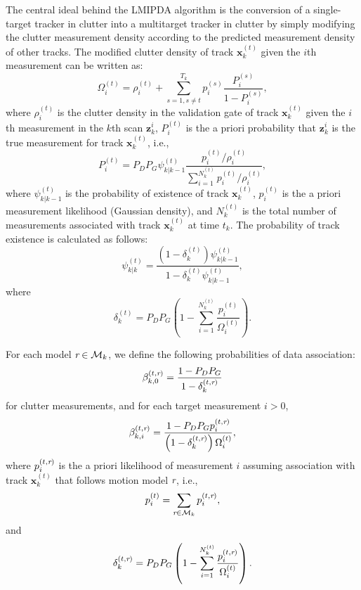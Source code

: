 \documentclass[times]{asjcauth}
\begin{document}
The central ideal behind the LMIPDA algorithm is the conversion of a single-target tracker in clutter into a multitarget tracker in clutter by simply modifying the clutter measurement density according to the predicted measurement density of other tracks. The modified clutter density of track $\mathbf{x}_{k}^{(t)}$ given the $i$th measurement can be written as:
\begin{equation*}
\Omega_{i}^{(t)} = \rho_{i}^{(t)} + \sum_{s=1,s\neq
t}^{T_{k}}p_{i}^{(s)}\frac{P_{i}^{(s)}}{1-P_{i}^{(s)}},
\end{equation*}
\noindent where $\rho_{i}^{(t)}$ is the clutter density in the validation gate of track $\mathbf{x}_{k}^{(t)}$ given the $i$th measurement in the $k$th scan $\mathbf{z}_{k}^{i}$, $P_{i}^{(t)}$ is the a priori probability that $\mathbf{z}_{k}^{i}$ is the true measurement for track $\mathbf{x}_{k}^{(t)}$, i.e.,
\begin{equation*}
P_{i}^{(t)} =
P_{D}P_{G}\psi_{k|k-1}^{(t)}\frac{p_{i}^{(t)}/\rho_{i}^{(t)}}{\sum_{i=1}^{N_{k}^{(t)}}{p_{i}^{(t)}/\rho_{i}^{(t)}}},
\end{equation*}
\noindent where $\psi_{k|k-1}^{(t)}$ is the probability of existence of track $\mathbf{x}_{k}^{(t)}$, $p_{i}^{(t)}$ is the a priori measurement likelihood (Gaussian density), and $N_{k}^{(t)}$ is the total number of measurements associated with track $\mathbf{x}_{k}^{(t)}$ at time $t_{k}$. The probability of track existence is calculated as follows:
\begin{equation*}\label{eqexistence}
\psi_{k|k}^{(t)} = \frac{\left(1-\delta_{k}^{(t)}\right)\psi_{k|k-1}^{(t)}}{1-\delta_{k}^{(t)}\psi_{k|k-1}^{(t)}},
\end{equation*}
\noindent where
\begin{equation*}
\delta_{k}^{(t)} = P_{D}P_{G}\left(1-\sum_{i=1}^{N_{k}^{(t)}}\frac{p_{i}^{(t)}}{\Omega_{i}^{(t)}}\right).
\end{equation*}

For each model $\emph{r}\in\mathcal{M}_{k}$, we define the following probabilities of data association:
\begin{equation*}
\beta_{k,0}^{(t,\emph{r})} = \frac{1-P_{D}P_{G}}{1-\delta_{k}^{(t,\emph{r})}}
\end{equation*}
\noindent for clutter measurements, and for each target measurement $i>0$,
\begin{equation*}
\beta_{k,i}^{(t,\emph{r})} = \frac{1-P_{D}P_{G}p_{i}^{(t,\emph{r})}}{\left(1-\delta_{k}^{(t,\emph{r})}\right)\Omega_{i}^{(t)}},
\end{equation*}
\noindent where $p_{i}^{(t,\emph{r})}$ is the a priori likelihood of measurement $i$ assuming association with track $\mathbf{x}_{k}^{(t)}$ that follows motion model $\emph{r}$, i.e.,
\begin{equation*}
p_{i}^{(t)} = \sum_{\emph{r}\in\mathcal{M}_{k}}p_{i}^{(t,\emph{r})},
\end{equation*}
\noindent and
\begin{equation*}
\delta_{k}^{(t,\emph{r})} = P_{D}P_{G}\left(1-\sum_{i=1}^{N_{k}^{(t)}}\frac{p_{i}^{(t,\emph{r})}}{\Omega_{i}^{(t)}}\right).
\end{equation*}
\end{document}
